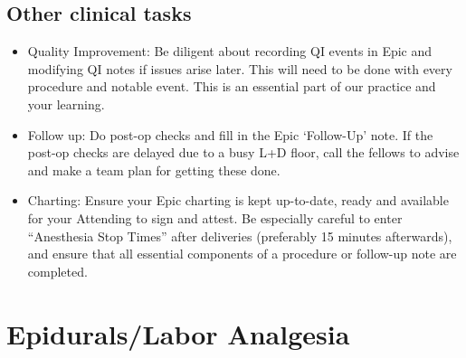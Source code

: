 \documentclass[twoside,8pt]{extarticle}
\providecommand{\tightlist}{%
}
\begin{document}
\subsection{Other clinical tasks}\label{other-clinical-tasks-2}

\begin{itemize}
\tightlist
\item
  Quality Improvement: Be diligent about recording QI events in Epic and
  modifying QI notes if issues arise later. This will need to be done
  with every procedure and notable event. This is an essential part of
  our practice and your learning.
\item
  Follow up: Do post-op checks and fill in the Epic `Follow-Up' note. If
  the post-op checks are delayed due to a busy L+D floor, call the
  fellows to advise and make a team plan for getting these done.
\item
  Charting: Ensure your Epic charting is kept up-to-date, ready and
  available for your Attending to sign and attest. Be especially careful
  to enter ``Anesthesia Stop Times'' after deliveries (preferably 15
  minutes afterwards), and ensure that all essential components of a
  procedure or follow-up note are completed.
\end{itemize}

\section{Epidurals/Labor Analgesia}\label{epiduralslabor-analgesia-3}
\end{document}
